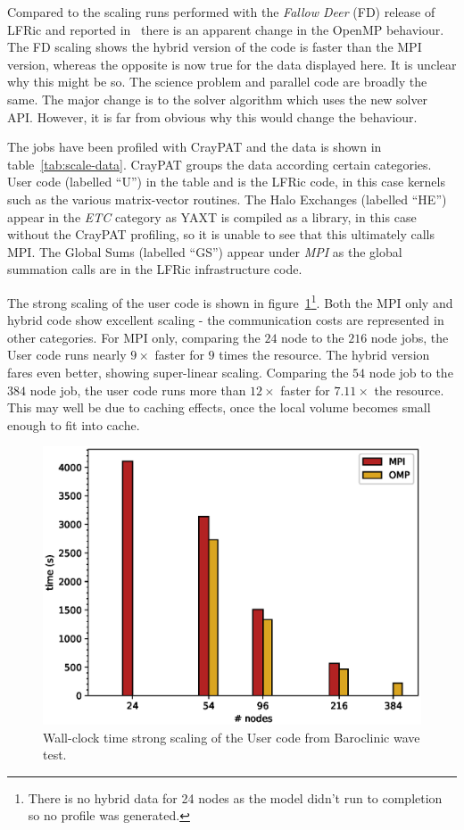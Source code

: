 Compared to the scaling runs performed with the {\em Fallow Deer} (FD)
release of LFRic and reported in~\cite{LFRic} there is an apparent
change in the OpenMP behaviour. The FD scaling shows the hybrid version of
the code is faster than the MPI version, whereas the opposite is now
true for the data displayed here. It is unclear why this might be
so. The science problem and parallel code are broadly the same. The
major change is to the solver algorithm which uses the new solver
API. However, it is far from obvious why this would change the
behaviour.

The jobs have been profiled with CrayPAT and the data is shown in
table~\ref{tab:scale-data}. CrayPAT groups the data according certain
categories. User code (labelled ``U'') in the table and is the LFRic
code, in this case kernels such as the various matrix-vector
routines. The Halo Exchanges (labelled ``HE'') appear in the {\em ETC}
category as YAXT is compiled as a library, in this case without the
CrayPAT profiling, so it is unable to see that this ultimately calls
MPI. The Global Sums (labelled ``GS'') appear under {\em MPI} as the
global summation calls are in the LFRic infrastructure code.

The strong scaling of the user code is shown in
figure~\ref{fig:U_scale}\footnote{There is no hybrid data for 24 nodes
  as the model didn't run to completion so no profile was generated.}.
Both the MPI only and hybrid code show excellent scaling - the
communication costs are represented in other categories. For MPI
only, comparing the $24$ node to the $216$ node jobs, the User code
runs nearly $9\times$ faster for $9$ times the resource. The hybrid
version fares even better, showing super-linear scaling. Comparing the
$54$ node job to the $384$ node job, the user code runs more than
$12\times$ faster for $7.11\times$ the resource. This may well be due
to caching effects, once the local volume becomes small enough to fit
into cache.


\begin{figure}[ht!]
\centering\includegraphics[width=1.0\linewidth]{figs/U-scale.eps}
\caption{\label{fig:U_scale}Wall-clock time strong scaling of the 
  User code from Baroclinic wave test.}
\end{figure} 

